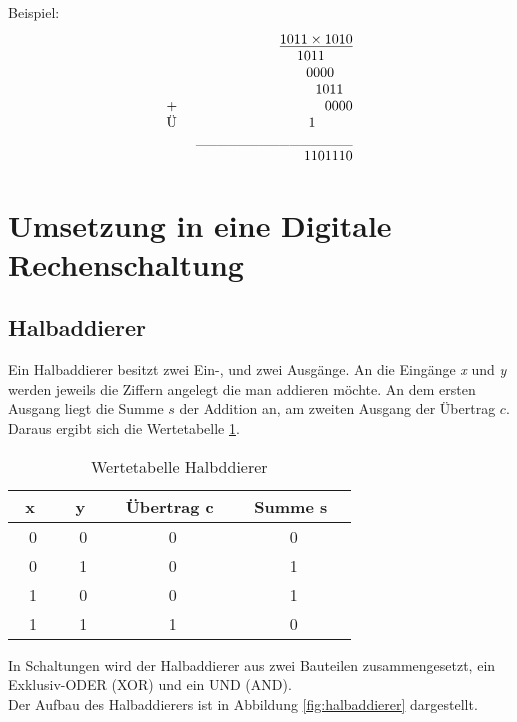\documentclass[a4paper,12pt,fleqn,oneside]{article}
\begin{document}
		Beispiel:
			\[ \begin{array}{lrcll}
   					&		 	       	\uline{1 0 1 1 \times 1 0 1 0}   	 				\\
  			       		&   			            1 0 1 1 $ $$ $$ $$ $$ $$ $        	 			\\ 
					&   			            0 0 0 0 $ $$ $$ $$ $        	 				\\ 
					&   			            1 0 1 1 $ $$ $        	 					\\ 
				$+ $	&   			            0 0 0 0			        	 				\\ 
				$Ü $	&			      	    1 $ $$ $$ $$ $$ $$ $$ $$ $					\\
					&	\_\_\_\_\_\_\_\_\_\_\_\_\_\_\_						\\
					&				    1101110
			\end{array} \]

			

\newpage
	
	\section{Umsetzung in eine Digitale Rechenschaltung}
	\subsection{Halbaddierer}
	Ein Halbaddierer besitzt zwei Ein-, und zwei Ausgänge. An die Eingänge \emph{x} und \emph{y} werden jeweils die Ziffern 			angelegt die man addieren möchte. An dem ersten Ausgang liegt die Summe $s$ der Addition an, am zweiten Ausgang der 			Übertrag $c$.\\
	Daraus ergibt sich die Wertetabelle \ref{tab:halbaddierer}.
	\begin{table}[h]
		\center
		\begin{tabular}{c|c|c|c}
			\ \textbf{x} \ 	& \ \textbf{y} \ 	& \ \textbf{Übertrag c} \ & \ \textbf{Summe s} \ 	 	\\ \hline
			0 	& 0 		& 0          		& 0       			\\ \hline
			0 	& 1 		& 0          		& 1       			\\ \hline	
			1 	& 0		& 0          		& 1      			 \\ \hline
			1	& 1 		& 1          		& 0      			 \\
		\end{tabular}
		\caption{Wertetabelle Halbddierer}
		\label{tab:halbaddierer}
	\end{table}

	\noindent
	In Schaltungen wird der Halbaddierer aus zwei Bauteilen zusammengesetzt, ein Exklusiv-ODER (XOR) und ein UND (AND).\\
	Der Aufbau des Halbaddierers ist in Abbildung \ref{fig:halbaddierer} dargestellt.
\end{document}

